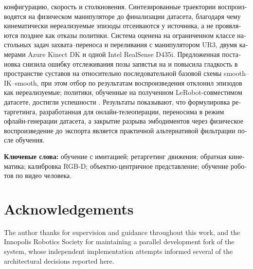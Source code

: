\documentclass[12pt, a4paper, oneside]{report}
\begin{document}
\begin{russian}
конфигурацию, скорость и столкновения. Синтезированные траектории
воспроизводятся на физическом манипуляторе до финализации датасета, благодаря
чему кинематически нереализуемые эпизоды отсеиваются у источника, а не
проявляются позднее как отказы политики. Система оценена на ограниченном классе
настольных задач захвата--переноса и переливания с манипулятором UR3, двумя
камерами Azure Kinect DK и одной Intel RealSense D435i. Предложенная постановка
снизила ошибку отслеживания позы запястья на  и повысила гладкость в
пространстве суставов на  относительно последовательной базовой схемы
smooth--IK--smooth, при этом отбор по результатам воспроизведения отклонил
 эпизодов как нереализуемые; политики, обученные на полученном
LeRobot-совместимом датасете, достигли успешности . Результаты
показывают, что формулировка ретаргетинга, разработанная для
онлайн-телеоперации, переносима в режим офлайн-генерации датасета, а закрытие
разрыва эмбодиментов через физическое воспроизведение до экспорта является
практичной альтернативой фильтрации после обучения.

\vspace{3mm}
\noindent\textbf{Ключевые слова:} обучение с имитацией; ретаргетинг движения;
обратная кинематика; калибровка RGB-D; объектно-центричное представление;
обучение роботов по видео человека.
\end{russian}

\chapter*{Acknowledgements}
\ph{[Placeholder.]} The author thanks \ph{[supervisor]} for supervision and
guidance throughout this work, and the Innopolis Robotics Society for
maintaining a parallel development fork of the system, whose independent
implementation attempts informed several of the architectural decisions
reported here.

\tableofcontents
\listoffigures
\listoftables

\cleardoublepage
{}
\setcounter{page}{1}









\end{document}
